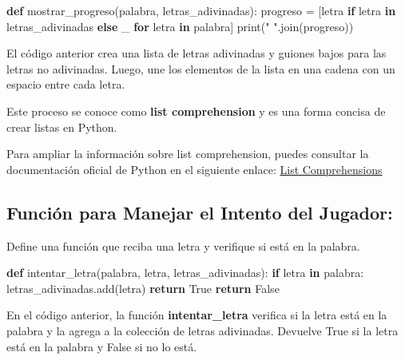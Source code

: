 \documentclass[
  a4paper,
  DIV=11,
  numbers=noendperiod,
  onepage,
  openany]{scrreprt}
\newenvironment{Shaded}{\begin{snugshade}}{\end{snugshade}}
\newcommand{\BuiltInTok}[1]{\textcolor[rgb]{0.00,0.23,0.31}{#1}}
\newcommand{\ControlFlowTok}[1]{\textcolor[rgb]{0.00,0.23,0.31}{\textbf{#1}}}
\newcommand{\KeywordTok}[1]{\textcolor[rgb]{0.00,0.23,0.31}{\textbf{#1}}}
\newcommand{\NormalTok}[1]{\textcolor[rgb]{0.00,0.23,0.31}{#1}}
\newcommand{\OperatorTok}[1]{\textcolor[rgb]{0.37,0.37,0.37}{#1}}
\newcommand{\StringTok}[1]{\textcolor[rgb]{0.13,0.47,0.30}{#1}}
\newcommand{\VariableTok}[1]{\textcolor[rgb]{0.07,0.07,0.07}{#1}}
\begin{document}
\begin{Shaded}
\begin{Highlighting}[]
\KeywordTok{def}\NormalTok{ mostrar\_progreso(palabra, letras\_adivinadas):}
\NormalTok{    progreso }\OperatorTok{=}\NormalTok{ [letra }\ControlFlowTok{if}\NormalTok{ letra }\KeywordTok{in}\NormalTok{ letras\_adivinadas }\ControlFlowTok{else} \StringTok{\textquotesingle{}\_\textquotesingle{}} \ControlFlowTok{for}\NormalTok{ letra }\KeywordTok{in}\NormalTok{ palabra]}
    \BuiltInTok{print}\NormalTok{(}\StringTok{" "}\NormalTok{.join(progreso))}
\end{Highlighting}
\end{Shaded}

El código anterior crea una lista de letras adivinadas y guiones bajos
para las letras no adivinadas. Luego, une los elementos de la lista en
una cadena con un espacio entre cada letra.

Este proceso se conoce como \textbf{list comprehension} y es una forma
concisa de crear listas en Python.

Para ampliar la información sobre list comprehension, puedes consultar
la documentación oficial de Python en el siguiente enlace:
\href{https://docs.python.org/3/tutorial/datastructures.html\#list-comprehensions}{List
Comprehensions}

\subsection{Función para Manejar el Intento del
Jugador:}\label{funciuxf3n-para-manejar-el-intento-del-jugador}

Define una función que reciba una letra y verifique si está en la
palabra.

\begin{Shaded}
\begin{Highlighting}[]
\KeywordTok{def}\NormalTok{ intentar\_letra(palabra, letra, letras\_adivinadas):}
    \ControlFlowTok{if}\NormalTok{ letra }\KeywordTok{in}\NormalTok{ palabra:}
\NormalTok{        letras\_adivinadas.add(letra)}
        \ControlFlowTok{return} \VariableTok{True}
    \ControlFlowTok{return} \VariableTok{False}
\end{Highlighting}
\end{Shaded}

En el código anterior, la función \textbf{intentar\_letra} verifica si
la letra está en la palabra y la agrega a la colección de letras
adivinadas. Devuelve True si la letra está en la palabra y False si no
lo está.
\end{document}
